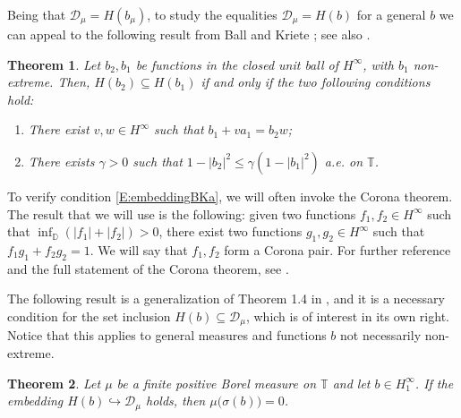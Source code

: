 \documentclass[12pt]{amsart}
\newtheorem{theorem}{Theorem}[section]
\theoremstyle{definition}
\theoremstyle{remark}
\theoremstyle{remark}
\begin{document}
 Being that $\mathcal{D}_\mu = H(b_\mu)$, to study the equalities $\mathcal{D}_\mu = H(b)$ for a general $b$ we can appeal to the  following result from Ball and Kriete \cite{ballkriete}; see also \cite[Theorem 27.15]{hb2}.
 
 \begin{theorem} \label{T:embeddingBK}
     Let $b_2, b_1$ be functions in the closed unit ball of $H^\infty$, with $b_1$ non-extreme. Then, $H(b_2) \subseteq H(b_1)$ if and only if the two following conditions hold:
         \begin{enumerate}[label={\rm (\roman*)}]
             \item \label{E:embeddingBKa} There exist $v,w\in H^\infty$ 
 such that $b_1 +v a_1 = b_2 w$;
             \item \label{E:embeddingBKb} There exists $\gamma>0$ such that $1-|b_2|^2\leq \gamma(1-|b_1|^2)$ a.e. on $\mathbb{T}$.
         \end{enumerate}
 \end{theorem}

To verify condition \ref{E:embeddingBKa}, we will often invoke the
Corona theorem. The result that we will use is the following: given
two functions $f_1,f_2\in H^\infty$ such that
$\inf_{\mathbb{D}}(|f_1|+|f_2|)>0$, there exist two functions
$g_1,g_2\in H^\infty$ such that $f_1g_1+f_2g_2=1$. We will say that
$f_1,f_2$ form a Corona pair. For further reference and the full
statement of the Corona theorem, see \cite[Theorem 2.1]{garnett}. 


The following result is a generalization of Theorem 1.4 in \cite{bellavita2023embedding}, and it is a necessary condition for the set inclusion $H(b)\subseteq\mathcal{D}_\mu$, which is of interest in its own right. Notice that this applies to general measures and functions $b$ not necessarily non-extreme.

\begin{theorem}\label{T:HbinDmnec}
Let $\mu$ be a finite positive Borel measure on $\mathbb{T}$ and let $b\in H^\infty_1$. If the embedding $H(b) \hookrightarrow \mathcal{D}_\mu$ holds, then $\mu\big(\sigma(b)\big)=0$.
\end{theorem} 
\end{document}
